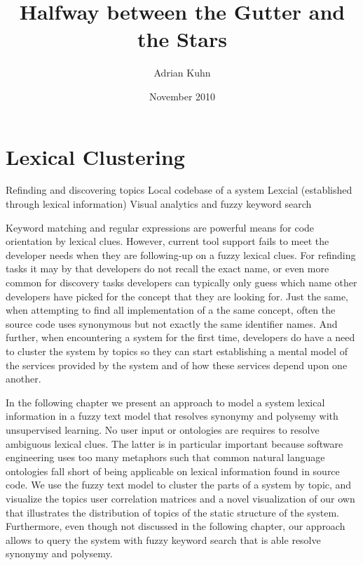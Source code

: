 \documentclass[10pt]{book}
\title{Halfway between the Gutter and the Stars}
\author{Adrian Kuhn}
\date{November 2010}
\begin{document}
\maketitle

\setcounter{tocdepth}{1}
\tableofcontents



\chapter{Lexical Clustering}
\label{the chapter on lexical clues}

\infobox
	{Refinding and discovering topics}
	{Local codebase of a system}
	{Lexcial (established through lexical information)}
	{Visual analytics and fuzzy keyword search}

Keyword matching and regular expressions are powerful means for code orientation by lexical clues. However, current tool support fails to meet the developer needs when they are following-up on a fuzzy lexical clues. For refinding tasks it may by that developers do not recall the exact name, or even more common for discovery tasks developers can typically only guess which name other developers have picked for the concept that they are looking for. Just the same, when attempting to find all implementation of a the same concept, often the source code uses synonymous but not exactly the same identifier names. And further, when encountering a system for the first time, developers do have a need to cluster the system by topics so they can start establishing a mental model of the services provided by the system and of how these services depend upon one another. 

In the following chapter we present an approach to model a system lexical information in a fuzzy text model that resolves synonymy and polysemy with unsupervised learning. No user input or ontologies are requires to resolve ambiguous lexical clues. The latter is in particular important because software engineering uses too many metaphors such that common natural language ontologies fall short of being applicable on lexical information found in source code. We use the fuzzy text model to cluster the parts of a system by topic, and visualize the topics user correlation matrices and a novel visualization of our own that illustrates the distribution of topics of the static structure of the system. Furthermore, even though not discussed in the following chapter, our approach allows to query the system with fuzzy keyword search that is able resolve synonymy and polysemy.
\end{document}
